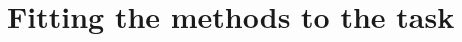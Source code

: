 \section{Fitting the methods to the task}
\label{FittingTheMethods}





































